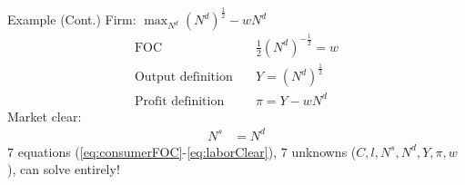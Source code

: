 \documentclass[11pt,aspectratio=169,usenames,dvipsnames]{beamer}
\begin{document}
\begin{frame}{Example (Cont.)}
\label{slide:Example__Cont__}
    Firm: $ \max_{N^{d}} ( N^{d} )^{\frac{1}{2}} - w N^{d} $
    \begin{align}
        \text{FOC} \quad
            & \frac{1}{2} ( N^{d} )^{- \frac{1}{2}} = w
            \label{eq:firmFOC}
        \\
        \text{Output definition} \quad
            & Y = ( N^{d} )^{\frac{1}{2}}
            \label{eq:outputDef}
        \\
        \text{Profit definition} \quad
            & \pi = Y - w N^{d}
            \label{eq:profitDef}
    \end{align}
    Market clear:
    \begin{align}
        N^{s} & = N^{d}
        \label{eq:laborClear}
    \end{align}
$ 7 $ equations (\eqref{eq:consumerFOC}-\eqref{eq:laborClear}), $ 7  $ unknowns ($C, l, N^{s}, N^{d}, Y, \pi, w$), can solve entirely!
\end{frame}
\end{document}
